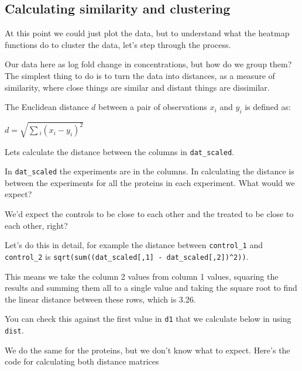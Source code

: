 \documentclass[12pt,]{book}
\theoremstyle{definition}
\theoremstyle{definition}
\theoremstyle{definition}
\theoremstyle{remark}
\begin{document}
\subsection{Calculating similarity and
clustering}\label{calculating-similarity-and-clustering}

At this point we could just plot the data, but to understand what the
heatmap functions do to cluster the data, let's step through the
process.

Our data here as log fold change in concentrations, but how do we group
them? The simplest thing to do is to turn the data into distances, as a
measure of similarity, where close things are similar and distant things
are dissimilar.

The Euclidean distance \(d\) between a pair of observations \(x_i\) and
\(y_i\) is defined as:

\(d = \sqrt{\sum{_i}(x_i - y_i)^2}\)

Lets calculate the distance between the columns in \texttt{dat\_scaled}.

In \texttt{dat\_scaled} the experiments are in the columns. In
calculating the distance is between the experiments for all the proteins
in each experiment. What would we expect?

We'd expect the controls to be close to each other and the treated to be
close to each other, right?

Let's do this in detail, for example the distance between
\texttt{control\_1} and \texttt{control\_2} is
\texttt{sqrt(sum((dat\_scaled{[},1{]}\ -\ dat\_scaled{[},2{]})\^{}2))}.

This means we take the column 2 values from column 1 values, squaring
the results and summing them all to a single value and taking the square
root to find the linear distance between these rows, which is 3.26.

You can check this against the first value in \texttt{d1} that we
calculate below in using \texttt{dist}.

We do the same for the proteins, but we don't know what to expect.
Here's the code for calculating both distance matrices
\end{document}
